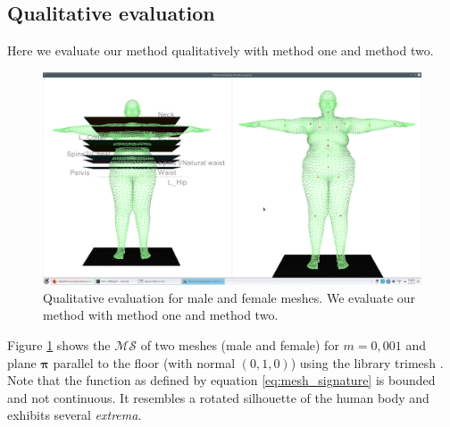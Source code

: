 \documentclass[runningheads]{llncs}
\begin{document}
\subsection{Qualitative evaluation}\label{subsec:qualitative_eval}
Here we evaluate our method qualitatively with method one and method two.
\begin{figure}[H]
	\begin{center}
		\includegraphics[width=\linewidth]{subject_6_with_cutting_planes_on_joints.eps}
	\end{center}
	\caption{Qualitative evaluation for male and female meshes. We evaluate our 
	method with method one and method two.}
	\label{fig:qualitative_eval}
\end{figure}

Figure \ref{fig:qualitative_eval} shows the $\mathcal{MS}$ of two meshes (male 
and female) for 
$m=0,001$ and plane $\boldsymbol{\pi}$ parallel to the floor (with normal $(0, 
1,0)$) using the library trimesh \cite{trimesh}. Note that the function as 
defined by equation \ref{eq:mesh_signature} is bounded and not continuous. It 
resembles a rotated silhouette of the human body and exhibits several 
\textit{extrema}.
\end{document}

